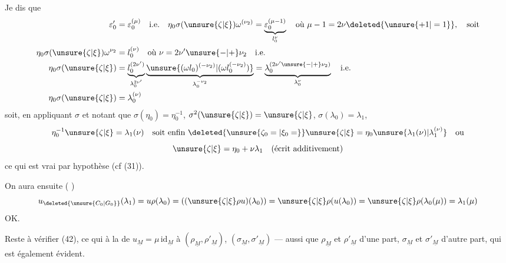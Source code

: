 
Je dis que
\[
\begin{aligned}
\varepsilon'_0&=\varepsilon_0^{(\mu)}\quad\text{i.e.}\quad
\eta_0\sigma(\unsure{\zeta|\xi})\omega^{(\nu_2)}
 =\underbrace{\varepsilon_0^{(\mu-1)}}_{l_0^\nu}
\quad\text{où }\mu-1=2\nu\deleted{\unsure{+1|=1}},\quad\text{soit}\\
\eta_0\sigma(\unsure{\zeta|\xi})\omega^{\nu_2}&=l_0^{(\nu)}
\quad\text{où }\nu=2\nu'\unsure{-|+}\nu_2\quad\text{i.e.}\\
\eta_0\sigma(\unsure{\zeta|\xi})
 &=\underbrace{l_0^{(2\nu')}}_{\lambda_0^{2\nu'}}
 \underbrace{\unsure{(\omega l_0)^{(-\nu_2)}|(\omega l_0^{(-\nu_2)})}}_{\lambda_0^{-\nu_2}}
 =\underbrace{\lambda_0^{(2\nu'\unsure{-|+}\nu_2)}}_{\lambda_0^\nu}
 \quad\text{i.e.}\\
\eta_0\sigma(\unsure{\zeta|\xi})&=\lambda_0^{(\nu)}
\end{aligned}
\]
soit, en appliquant $\sigma$ et notant que
$\sigma(\eta_0)=\eta_0^{-1}$, $\sigma^2(\unsure{\zeta|\xi})=\unsure{\zeta|\xi}$,
$\sigma(\lambda_0)=\lambda_1$,
\[
\eta_0^{-1}\unsure{\zeta|\xi}=\lambda_1(\nu)
\quad\text{soit enfin }\deleted{\unsure{\zeta_0=|\xi_0=}}
\unsure{\zeta|\xi}=\eta_0\unsure{\lambda_1(\nu)|\lambda_1^{(\nu)}}
\quad\text{ou}
\]
\[
\unsure{\zeta|\xi}=\eta_0+\nu\lambda_1\quad\text{(écrit additivement)}
\]
ce qui est vrai par hypothèse (cf (31)).

On aura ensuite
(
)
\[
u_{\deleted{\unsure{C_0|G_0}}}(\lambda_1)
 =u\rho(\lambda_0)
 =((\unsure{\zeta|\xi}\rho u)(\lambda_0))
 =\unsure{\zeta|\xi}\rho(u(\lambda_0))
 =\unsure{\zeta|\xi}\rho(\lambda_0(\mu))
 =\lambda_1(\mu)
\]
OK.

Reste à vérifier (42), ce qui 
 à la  de
$u_{\underline M}=\mu\,\mathrm{id}_{\underline M}$ à
$(\rho_{\underline M},\rho'_{\underline M})$,
$(\sigma_{\underline M},\sigma'_{\underline M})$
---  aussi que
$\rho_{\underline M}$ et $\rho'_{\underline M}$ d'une part,
$\sigma_{\underline M}$ et $\sigma'_{\underline M}$ d'autre part,
qui est également évident.

